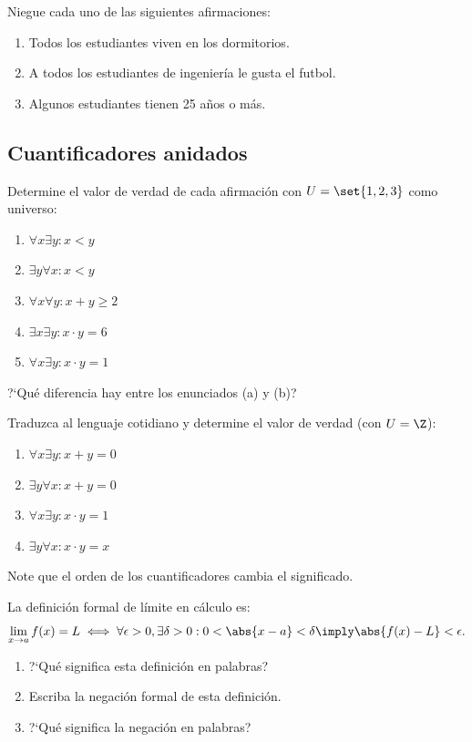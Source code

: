 \begin{problema}
	Niegue cada uno de las siguientes afirmaciones:
	\begin{enumerate}
		\item Todos los estudiantes viven en los dormitorios.
		\item A todos los estudiantes de ingeniería le gusta el futbol.
		\item Algunos estudiantes tienen 25 años o más.
	\end{enumerate}
\end{problema}

\subsection*{Cuantificadores anidados}

\begin{problema}
	Determine el valor de verdad de cada afirmación con $U = \set{1,2,3}$ como universo:
	\begin{enumerate}
		\item $\forall x \exists y: x < y$
		\item $\exists y \forall x: x < y$
		\item $\forall x \forall y: x + y \geq 2$
		\item $\exists x \exists y: x \cdot y = 6$
		\item $\forall x \exists y: x \cdot y = 1$
	\end{enumerate}
	?`Qué diferencia hay entre los enunciados (a) y (b)?
\end{problema}

\begin{problema}
	Traduzca al lenguaje cotidiano y determine el valor de verdad (con $U = \Z$):
	\begin{enumerate}
		\item $\forall x \exists y: x + y = 0$
		\item $\exists y \forall x: x + y = 0$
		\item $\forall x \exists y: x \cdot y = 1$
		\item $\exists y \forall x: x \cdot y = x$
	\end{enumerate}
	Note que el orden de los cuantificadores cambia el significado.
\end{problema}

\begin{problema}
	La definición formal de límite en cálculo es:
	$$
	\lim_{x \to a} f(x) = L \iff \forall \epsilon > 0, \exists \delta > 0: 0 < \abs{x-a} < \delta \imply \abs{f(x) - L} < \epsilon.
	$$
	\begin{enumerate}
		\item ?`Qué significa esta definición en palabras?
		\item Escriba la negación formal de esta definición.
		\item ?`Qué significa la negación en palabras?
	\end{enumerate}
\end{problema}

